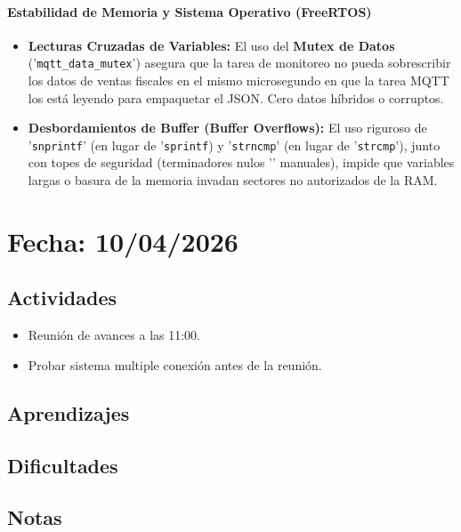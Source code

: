 \documentclass[12pt, a4paper]{article}
\begin{document}
    \paragraph{Estabilidad de Memoria y Sistema Operativo (FreeRTOS)}

    \begin{itemize}
        \item \textbf{Lecturas Cruzadas de Variables:} El uso del \textbf{Mutex de Datos} ('\texttt{mqtt\_data\_mutex}') asegura que la tarea de monitoreo no pueda sobrescribir los datos de ventas fiscales en el mismo microsegundo en que la tarea MQTT los está leyendo para empaquetar el JSON. Cero datos híbridos o corruptos.
        \item \textbf{Desbordamientos de Buffer (Buffer Overflows):} El uso riguroso de '\texttt{snprintf}' (en lugar de '\texttt{sprintf}) y '\texttt{strncmp}' (en lugar de '\texttt{strcmp}'), junto con topes de seguridad (terminadores nulos '\0' manuales), impide que variables largas o basura de la memoria invadan sectores no autorizados de la RAM.
    \end{itemize}

    \section*{Fecha: 10/04/2026}

    \subsection*{Actividades}

    \begin{itemize}
        \item Reunión de avances a las 11:00.
        \item Probar sistema multiple conexión antes de la reunión.
    \end{itemize}

    \subsection*{Aprendizajes}

    \subsection*{Dificultades}

    \subsection*{Notas}
\end{document}
